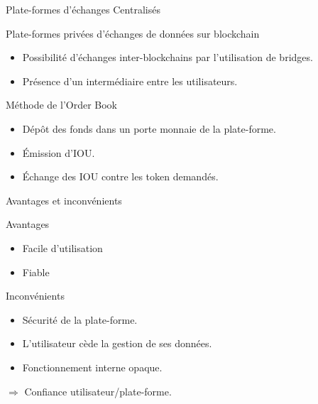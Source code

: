 \begin{frame}{Plate-formes d'échanges Centralisés}
    \begin{block}{Plate-formes privées d'échanges de données sur blockchain}
        \begin{itemize}
            \item Possibilité d'échanges inter-blockchains par l'utilisation de bridges.
            \item Présence d'un intermédiaire entre les utilisateurs.
        \end{itemize}
    \end{block}
\pause
    \begin{block}{Méthode de l'Order Book}
        \begin{itemize}
            \item Dépôt des fonds dans un porte monnaie de la plate-forme. 
            \item Émission d'IOU\footnotemark.
            \item Échange des IOU contre les token demandés.
        \end{itemize}
    \end{block}
\end{frame}

\begin{frame}{Avantages et inconvénients}
    \begin{block}{Avantages}
        \begin{itemize}
            \item Facile d'utilisation
            \item Fiable
        \end{itemize}
    \end{block}
\pause
\begin{block}{Inconvénients}
    \begin{itemize}
        \item Sécurité de la plate-forme.
        \item L'utilisateur cède la gestion de ses données.
        \item Fonctionnement interne opaque.
    \end{itemize}
    $\Rightarrow$ Confiance utilisateur/plate-forme.
\end{block}
\end{frame}

